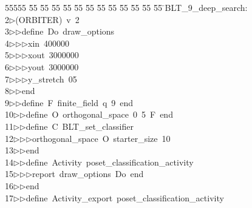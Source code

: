 %
%
\begin{tabbing}
55555 \= 55 \= 55 \= 55 \= 55 \= 55 \= 55 \= 55 \= 55 \= 55 \= 55 \= 55 \= 55 \= \>BLT\_9\_deep\_search:\\[0pt]
2\>$\triangleright$\>(ORBITER)\ v\ 2\ \\[0pt]
3\>$\triangleright$\>$\triangleright$\>define\ Do\ draw\_options\ \\[0pt]
4\>$\triangleright$\>$\triangleright$\>$\triangleright$\>xin\ 400000\ \\[0pt]
5\>$\triangleright$\>$\triangleright$\>$\triangleright$\>xout\ 3000000\ \\[0pt]
6\>$\triangleright$\>$\triangleright$\>$\triangleright$\>yout\ 3000000\ \\[0pt]
7\>$\triangleright$\>$\triangleright$\>$\triangleright$\>y\_stretch\ 05\ \\[0pt]
8\>$\triangleright$\>$\triangleright$\>end\ \\[0pt]
9\>$\triangleright$\>$\triangleright$\>define\ F\ finite\_field\ q\ 9\ end\ \\[0pt]
10\>$\triangleright$\>$\triangleright$\>define\ O\ orthogonal\_space\ 0\ 5\ F\ end\ \\[0pt]
11\>$\triangleright$\>$\triangleright$\>define\ C\ BLT\_set\_classifier\ \\[0pt]
12\>$\triangleright$\>$\triangleright$\>$\triangleright$\>orthogonal\_space\ O\ starter\_size\ 10\ \\[0pt]
13\>$\triangleright$\>$\triangleright$\>end\ \\[0pt]
14\>$\triangleright$\>$\triangleright$\>define\ Activity\ poset\_classification\_activity\ \\[0pt]
15\>$\triangleright$\>$\triangleright$\>$\triangleright$\>report\ draw\_options\ Do\ end\ \\[0pt]
16\>$\triangleright$\>$\triangleright$\>end\ \\[0pt]
17\>$\triangleright$\>$\triangleright$\>define\ Activity\_export\ poset\_classification\_activity\ \\[0pt]

\end{tabbing}
